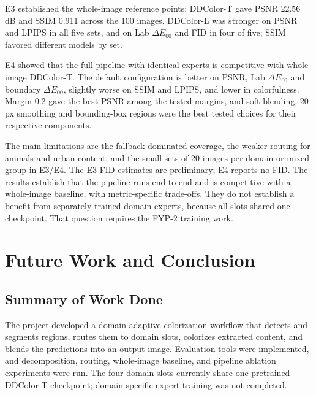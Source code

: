 \documentclass{FastFyp}
\begin{document}
E3 established the whole-image reference points: DDColor-T gave PSNR 22.56 dB
and SSIM 0.911 across the 100 images. DDColor-L was stronger on PSNR and LPIPS in all five sets, and on Lab $\Delta E_{00}$ and FID in four of five; SSIM favored different models by set.

E4 showed that the full pipeline with identical experts is competitive with
whole-image DDColor-T. The default configuration is better on PSNR, Lab
$\Delta E_{00}$ and boundary $\Delta E_{00}$, slightly worse on SSIM and
LPIPS, and lower in colorfulness. Margin 0.2 gave the best PSNR among the
tested margins, and soft blending, 20 px smoothing and bounding-box regions
were the best tested choices for their respective components.

The main limitations are the fallback-dominated coverage, the weaker routing
for animals and urban content, and the small sets of 20 images per domain or mixed group in E3/E4. The E3 FID estimates are preliminary; E4 reports no FID. The results establish that the
pipeline runs end to end and is competitive with a whole-image baseline, with metric-specific trade-offs. They do not establish a benefit from separately trained domain
experts, because all slots shared one checkpoint. That question requires the
FYP-2 training work.

\chapter{Future Work and Conclusion}
\label{ch:conclusion}

\section{Summary of Work Done}
\label{sec:summary-work}
The project developed a domain-adaptive colorization workflow that detects
and segments regions, routes them to domain slots, colorizes extracted
content, and blends the predictions into an output image. Evaluation tools
were implemented, and decomposition, routing, whole-image baseline, and
pipeline ablation experiments were run. The four domain slots currently share
one pretrained DDColor-T checkpoint; domain-specific expert training was not
completed.
\end{document}
